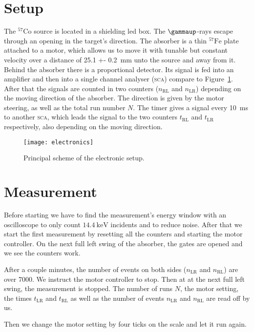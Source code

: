 \documentclass[11pt, english, fleqn, DIV=15, headinclude, BCOR=2cm]{scrreprt}
\newcommand\tRL{t_\text{RL}}
\newcommand\tLR{t_\text{LR}}
\newcommand\nRL{n_\text{RL}}
\newcommand\nLR{n_\text{LR}}
\begin{document}
\section{Setup}

The $^{57}\mathrm{Co}$ source is located in a shielding led box. The
$\gammaup$-rays escape through an opening in the target's direction. The
absorber is a thin $^{57}\mathrm{Fe}$ plate attached to a motor, which allows
us to move it with tunable but constant velocity over a distance of \SI{25.1 +-
0.2}{\milli\meter} unto the source and away from it. Behind the absorber there
is a proportional detector. Its signal is fed into an amplifier and then into a
single channel analyser (\textsc{sca}) compare to Figure~\ref{fig:electronics}.
After that the signals are counted in two counters ($n_\text{RL}$ and
$n_\text{LR}$) depending on the moving direction of the absorber. The direction
is given by the motor steering, as well as the total run number $N$. The timer
gives a signal every \SI{10}{\milli\second} to another \textsc{sca}, which
leads the signal to the two counters $t_\text{RL}$ and $t_\text{LR}$
respectively, also depending on the moving direction.

\begin{figure}
    \centering
    \texttt{[image: electronics]}
    \caption{%
        Principal scheme of the electronic setup.
    }
    \label{fig:electronics}
\end{figure}


\section{Measurement}

Before starting we have to find the measurement's energy window with an
oscilloscope to only count $\SI{14.4}{\kilo\electronvolt}$ incidents and to
reduce noise. After that we start the first measurement by resetting all the
counters and starting the motor controller. On the next full left swing of the
absorber, the gates are opened and we see the counters work.

After a couple minutes, the number of events on both sides ($\nLR$ and $\nRL$)
are over \num{7000}. We instruct the motor controller to stop. Then at at the
next full left swing, the measurement is stopped. The number of runs $N$, the
motor setting, the times $\tLR$ and $\tRL$ as well as the number of events
$\nLR$ and $\nRL$ are read off by us.

Then we change the motor setting by four ticks on the scale and let it run
again.
\end{document}
